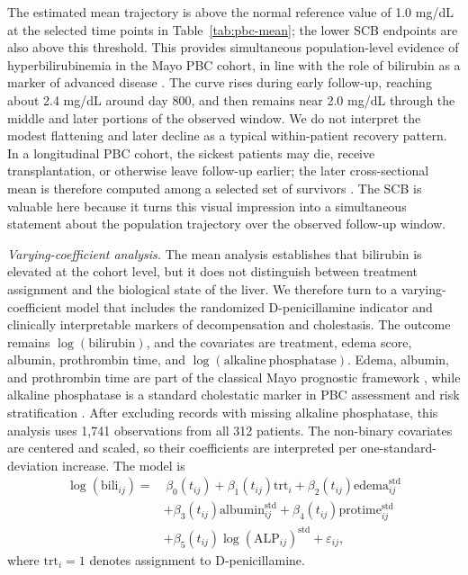 The estimated mean trajectory is above the normal reference value of
1.0 mg/dL at the selected time points in Table~\ref{tab:pbc-mean}; the lower
SCB endpoints are also above this threshold. This provides simultaneous
population-level evidence of hyperbilirubinemia in the Mayo PBC cohort, in
line with the role of bilirubin as a marker of advanced disease
\citep{Dickson1989,Prince2004,Corpechot2008}. The curve rises during early
follow-up, reaching about 2.4 mg/dL around day 800, and then remains near
2.0 mg/dL through the middle and later portions of the observed window. We do
not interpret the modest flattening and later decline as a typical
within-patient recovery pattern. In a longitudinal PBC cohort, the sickest
patients may die, receive transplantation, or otherwise leave follow-up earlier;
the later cross-sectional mean is therefore computed among a selected set of
survivors \citep{Murtaugh1994,WulfsohnTsiatis1997}. The SCB is valuable here
because it turns this visual impression into a simultaneous statement about
the population trajectory over the observed follow-up window.

\emph{Varying-coefficient analysis.}
The mean analysis establishes that bilirubin is elevated at the cohort level,
but it does not distinguish between treatment assignment and the biological
state of the liver. We therefore turn to a varying-coefficient model that
includes the randomized D-penicillamine indicator and clinically interpretable
markers of decompensation and cholestasis. The outcome remains
\(\log(\mathrm{bilirubin})\), and the covariates are treatment, edema score,
albumin, prothrombin time, and \(\log(\mathrm{alkaline\ phosphatase})\). Edema,
albumin, and prothrombin time are part of the classical Mayo prognostic
framework \citep{Dickson1989,Murtaugh1994}, while alkaline phosphatase is a
standard cholestatic marker in PBC assessment and risk stratification
\citep{Lindor2019,Lammers2014,Carbone2016}. After excluding records with
missing alkaline phosphatase, this analysis uses 1,741 observations from all
312 patients. The non-binary covariates are centered and scaled, so their
coefficients are interpreted per one-standard-deviation increase. The model is
\begin{equation}
\label{eq:pbc-vcm-model}
\begin{split}
\log(\mathrm{bili}_{ij})
=&\,\beta_0(t_{ij})+\beta_1(t_{ij})\mathrm{trt}_i
 +\beta_2(t_{ij})\mathrm{edema}^{\mathrm{std}}_{ij} \\
&+\beta_3(t_{ij})\mathrm{albumin}^{\mathrm{std}}_{ij}
 +\beta_4(t_{ij})\mathrm{protime}^{\mathrm{std}}_{ij} \\
&+\beta_5(t_{ij})\log(\mathrm{ALP}_{ij})^{\mathrm{std}}
 +\varepsilon_{ij},
\end{split}
\end{equation}
where \(\mathrm{trt}_i=1\) denotes assignment to D-penicillamine.

